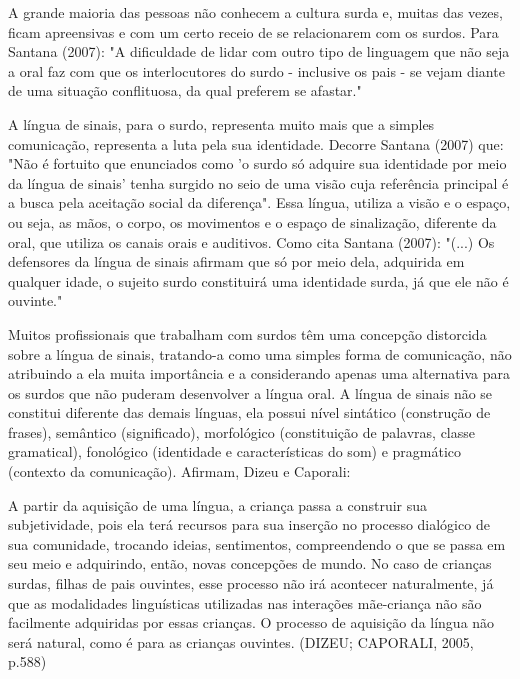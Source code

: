 \documentclass[brasil]{abnt}
\begin{document}
		A grande maioria das pessoas não conhecem a cultura surda e, muitas das vezes, ficam apreensivas e com um certo receio de se relacionarem com os surdos. Para Santana (2007): "A dificuldade de lidar 
		com outro tipo de linguagem que não seja a oral faz com que os interlocutores do surdo - inclusive os pais - se vejam diante de uma situação conflituosa, da qual preferem se afastar."		
		
		A língua de sinais, para o surdo, representa muito mais que a simples comunicação, representa a luta pela sua identidade. Decorre Santana (2007) que: "Não é fortuito que enunciados como 
		'o surdo só adquire sua identidade por meio da língua de sinais' tenha surgido no seio de uma visão cuja referência principal é a busca pela aceitação social da diferença". Essa língua, 
		utiliza a visão e o espaço, ou seja, as mãos, o corpo, os movimentos e o espaço de sinalização, diferente da oral, que utiliza os canais orais e auditivos. Como cita Santana (2007): "(...) Os 
		defensores da língua de sinais afirmam que só por meio dela, adquirida em qualquer idade, o sujeito surdo constituirá uma identidade surda, já que ele não é ouvinte."
			
		Muitos profissionais que trabalham com surdos têm uma concepção distorcida sobre a língua de sinais, tratando-a como uma simples forma de comunicação, não atribuindo a ela muita importância e a 
		considerando apenas uma alternativa para os surdos que não puderam desenvolver a língua oral. A língua de sinais não se constitui diferente das demais línguas, ela possui nível sintático 
		(construção de frases), semântico (significado), morfológico (constituição de palavras, classe gramatical), fonológico (identidade e características do som) e pragmático (contexto da comunicação). 
		Afirmam, Dizeu e Caporali:
			
				\begin{citacao}A partir da aquisição de uma língua, a criança passa a construir sua subjetividade, pois ela terá recursos para sua inserção no processo dialógico de sua comunidade, trocando 
								ideias, sentimentos, compreendendo o que se passa em seu meio e adquirindo, então, novas concepções de mundo. No caso de crianças surdas, filhas de pais ouvintes, esse processo 
								não irá acontecer naturalmente, já que as modalidades linguísticas utilizadas nas interações mãe-criança não são facilmente adquiridas por essas crianças. O processo de 
								aquisição da língua não será natural, como é para as crianças ouvintes. (DIZEU; CAPORALI, 2005, p.588)
				\end{citacao}
					
\end{document}
